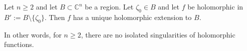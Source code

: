 Let $n \geqslant 2$ and let $B \subset \mathbb{C}^n$ be a region. Let $\zeta_0 \in B$ and let $f$ be holomorphic in $B' := B \setminus \{\zeta_0\}$. Then $f$ has a unique holomorphic extension to $B$.

In other words, for $n \geqslant 2$, there are no isolated singularities of holomorphic functions.
